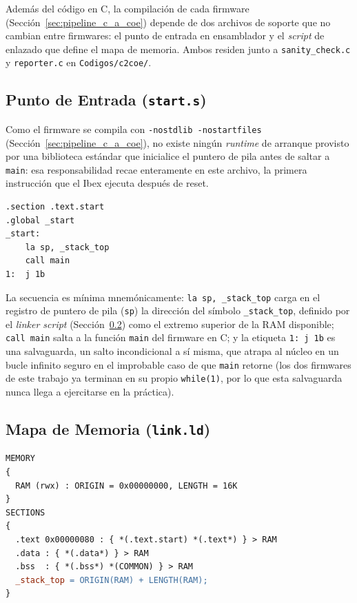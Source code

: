 Además del código en C, la compilación de cada firmware
(Sección~\ref{sec:pipeline_c_a_coe}) depende de dos archivos de soporte
que no cambian entre firmwares: el punto de entrada en ensamblador y el
\textit{script} de enlazado que define el mapa de memoria. Ambos residen
junto a \texttt{sanity\_check.c} y \texttt{reporter.c} en
\texttt{Codigos/c2coe/}.

\subsection{Punto de Entrada (\texttt{start.s})}
\label{ssec:codigo_start_s}

Como el firmware se compila con \texttt{-nostdlib -nostartfiles}
(Sección~\ref{sec:pipeline_c_a_coe}), no existe ningún \textit{runtime} de
arranque provisto por una biblioteca estándar que inicialice el puntero de
pila antes de saltar a \texttt{main}: esa responsabilidad recae
enteramente en este archivo, la primera instrucción que el Ibex ejecuta
después de reset.

\begin{lstlisting}[language={[riscv]Assembler}, basicstyle=\ttfamily\footnotesize, caption={Código fuente completo de \texttt{start.s}, el punto de entrada del firmware.}, label={code:start.s}]
.section .text.start
.global _start
_start:
    la sp, _stack_top
    call main
1:  j 1b
\end{lstlisting}

La secuencia es mínima mnemónicamente: \texttt{la sp, \_stack\_top} carga
en el registro de puntero de pila (\texttt{sp}) la dirección del símbolo
\texttt{\_stack\_top}, definido por el \textit{linker script}
(Sección~\ref{ssec:codigo_link_ld}) como el extremo superior de la RAM
disponible; \texttt{call main} salta a la función \texttt{main} del
firmware en C; y la etiqueta \texttt{1: j 1b} es una salvaguarda, un
salto incondicional a sí misma, que atrapa al núcleo en un bucle
infinito seguro en el improbable caso de que \texttt{main} retorne (los
dos firmwares de este trabajo ya terminan en su propio \texttt{while(1)},
por lo que esta salvaguarda nunca llega a ejercitarse en la práctica).


\subsection{Mapa de Memoria (\texttt{link.ld})}
\label{ssec:codigo_link_ld}

\begin{lstlisting}[language=make, basicstyle=\ttfamily\footnotesize, caption={Código fuente completo de \texttt{link.ld}, el script de enlazado que define el mapa de memoria del firmware.}, label={code:link.ld}]
MEMORY
{
  RAM (rwx) : ORIGIN = 0x00000000, LENGTH = 16K
}
SECTIONS
{
  .text 0x00000080 : { *(.text.start) *(.text*) } > RAM
  .data : { *(.data*) } > RAM
  .bss  : { *(.bss*) *(COMMON) } > RAM
  _stack_top = ORIGIN(RAM) + LENGTH(RAM);
}
\end{lstlisting}

